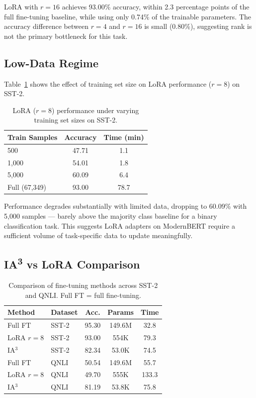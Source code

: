 \documentclass[11pt]{article}
\begin{document}
LoRA with $r=16$ achieves 93.00\% accuracy, within 2.3 percentage points
of the full fine-tuning baseline, while using only 0.74\% of the
trainable parameters. The accuracy difference between $r=4$ and $r=16$
is small (0.80\%), suggesting rank is not the primary bottleneck for
this task.

\subsection{Low-Data Regime}

Table~\ref{tab:lowdata} shows the effect of training set size on LoRA
performance ($r=8$) on SST-2.

\begin{table}[h]
\centering
\small
\begin{tabular}{lcc}
\toprule
\textbf{Train Samples} & \textbf{Accuracy} & \textbf{Time (min)} \\
\midrule
500   & 47.71 & 1.1  \\
1,000 & 54.01 & 1.8  \\
5,000 & 60.09 & 6.4  \\
Full (67,349) & 93.00 & 78.7 \\
\bottomrule
\end{tabular}
\caption{LoRA ($r=8$) performance under varying training set sizes on SST-2.}
\label{tab:lowdata}
\end{table}

Performance degrades substantially with limited data, dropping to 60.09\%
with 5,000 samples --- barely above the majority class baseline for a
binary classification task. This suggests LoRA adapters on ModernBERT
require a sufficient volume of task-specific data to update meaningfully.

\subsection{IA\textsuperscript{3} vs LoRA Comparison}


\begin{table}[h]
\centering
\small
\setlength{\tabcolsep}{4pt}
\begin{tabular}{llccc}
\toprule
\textbf{Method} & \textbf{Dataset} & \textbf{Acc.} & \textbf{Params} & \textbf{Time} \\
\midrule
Full FT          & SST-2 & 95.30 & 149.6M & 32.8 \\
LoRA $r=8$       & SST-2 & 93.00 & 554K   & 79.3 \\
IA$^3$           & SST-2 & 82.34 & 53.0K  & 74.5 \\
\midrule
Full FT          & QNLI  & 50.54 & 149.6M & 55.7 \\
LoRA $r=8$       & QNLI  & 49.70 & 555K   & 133.3 \\
IA$^3$           & QNLI  & 81.19 & 53.8K  & 75.8 \\
\bottomrule
\end{tabular}
\caption{Comparison of fine-tuning methods across SST-2 and QNLI. Full FT = full fine-tuning.}
\label{tab:comparison}
\end{table}
\end{document}
